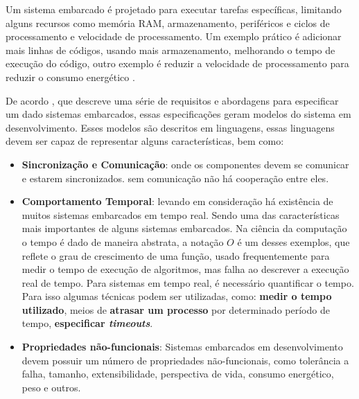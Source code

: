 
Um sistema embarcado é projetado para executar tarefas específicas, limitando alguns recursos como memória RAM, armazenamento, periféricos e ciclos de processamento e velocidade de processamento. Um exemplo prático é adicionar mais linhas de códigos, usando mais armazenamento, melhorando o tempo de execução do código, outro exemplo é reduzir a velocidade de processamento para reduzir o consumo energético \cite{white:2011}.

De acordo , que descreve uma série de requisitos e abordagens para especificar um dado sistemas embarcados, essas especificações geram modelos do sistema em desenvolvimento. Esses modelos são descritos em linguagens, essas linguagens devem ser capaz de representar alguns características, bem como:
\begin{itemize}
    \item \textbf{Sincronização e Comunicação}: onde os componentes devem se comunicar e estarem sincronizados. sem comunicação não há cooperação entre eles.
    
    \item \textbf{Comportamento Temporal}: levando em consideração há existência de muitos sistemas embarcados em tempo real. Sendo uma das características mais importantes de alguns sistemas embarcados. Na ciência da computação o tempo é dado de maneira abstrata, a notação $O$ é um desses exemplos, que reflete o grau de crescimento de uma função, usado frequentemente para medir o tempo de execução de algoritmos, mas falha ao descrever a execução real de tempo.
    Para sistemas em tempo real, é necessário quantificar o tempo. Para isso algumas técnicas podem ser utilizadas, como: \textbf{medir o tempo utilizado}, meios de \textbf{atrasar um processo} por determinado período de tempo, \textbf{especificar \textit{timeouts}}.  
    
    \item \textbf{Propriedades não-funcionais}: Sistemas embarcados em desenvolvimento devem possuir um número de propriedades não-funcionais, como tolerância a falha, tamanho, extensibilidade, perspectiva de vida, consumo energético, peso e outros.
\end{itemize}

